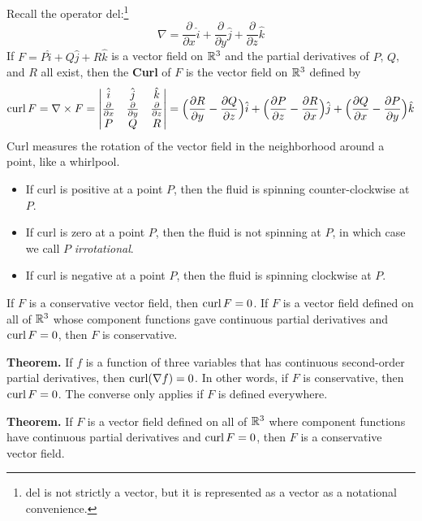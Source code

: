 Recall the operator del:\footnote{del is not strictly a vector, but it is represented as a vector as a notational convenience.} $$\nabla = \frac{\partial}{\partial x}\hat{i} + \frac{\partial}{\partial y}\hat{j} + \frac{\partial}{\partial z}\hat{k}$$ If $F = P\hat{i} + Q\hat{j} + R\hat{k}$ is a vector field on $\mathbb{R}^3$ and the partial derivatives of $P$, $Q$, and $R$ all exist, then the \textbf{Curl} of $F$ is the vector field on $\mathbb{R}^3$ defined by $$ \operatorname{curl}{F} = \nabla \times F =
\begin{vmatrix}
\hat{i}                     & \hat{j}                     & \hat{k} \\
\frac{\partial}{\partial x} & \frac{\partial}{\partial y} & \frac{\partial}{\partial z} \\
P                           & Q                           & R \\
\end{vmatrix}
= \Big(\frac{\partial R}{\partial y} - \frac{\partial Q}{\partial z} \Big)\hat{i} + \Big(\frac{\partial P}{\partial z} - \frac{\partial R}{\partial x} \Big)\hat{j} + \Big(\frac{\partial Q}{\partial x} - \frac{\partial P}{\partial y} \Big)\hat{k}
$$ Curl measures the rotation of the vector field in the neighborhood around a point, like a whirlpool. \begin{itemize}
    \item If curl is positive at a point $P$, then the fluid is spinning counter-clockwise at $P$.
    \item If curl is zero at a point $P$, then the fluid is not spinning at $P$, in which case we call $P$ \textit{irrotational}.
    \item If curl is negative at a point $P$, then the fluid is spinning clockwise at $P$.
\end{itemize} If $F$ is a conservative vector field, then $\operatorname{curl}{F} = 0$. If $F$ is a vector field defined on all of $\mathbb{R}^3$ whose component functions gave continuous partial derivatives and $\operatorname{curl}{F} = 0$, then $F$ is conservative.\newline

\textbf{Theorem.} If $f$ is a function of three variables that has continuous second-order partial derivatives, then $\operatorname{curl} (\nabla f) = 0$. In other words, if $F$ is conservative, then $\operatorname{curl}{F} = 0$. The converse only applies if $F$ is defined everywhere. \newline

\textbf{Theorem.} If $F$ is a vector field defined on all of $\mathbb{R}^3$ where component functions have continuous partial derivatives and $\operatorname{curl} F = 0$, then $F$ is a conservative vector field.

